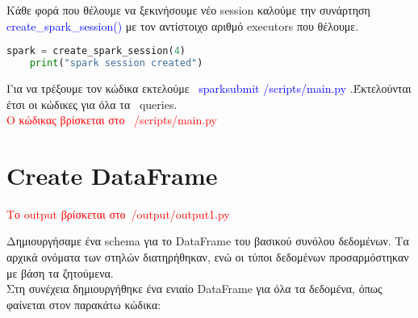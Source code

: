 \documentclass{article}
\begin{document}
\vspace{1\baselineskip}

Κάθε φορά που θέλουμε να ξεκινήσουμε νέο session καλούμε την συνάρτηση 
\textcolor{blue}{create\_spark\_session()} με τον αντίστοιχο αριθμό executors που θέλουμε.

\begin{lstlisting}[language = Python]
    spark = create_spark_session(4)
    print("spark session created")  
\end{lstlisting}

\vspace{1\baselineskip}

Για να τρέξουμε τον κώδικα εκτελούμε  \textcolor{blue}{spark\-submit /scripts/main.py} .Έκτελούνται έτσι οι κώδικες για όλα τα  queries. \\
\textcolor{red}{Ο κώδικας βρίσκεται στο  /scripts/main.py}

\section{Create DataFrame}

\textcolor{red}{Το output βρίσκεται στο /output/output1.py} \\
\vspace{1\baselineskip}

Δημιουργήσαμε ένα schema για το DataFrame του βασικού συνόλου δεδομένων. Τα αρχικά ονόματα των στηλών διατηρήθηκαν, ενώ οι τύποι δεδομένων προσαρμόστηκαν με βάση τα ζητούμενα. \\
Στη συνέχεια δημιουργήθηκε ένα ενιαίο DataFrame για όλα τα δεδομένα, όπως φαίνεται στον παρακάτω κώδικα: 
\end{document}
